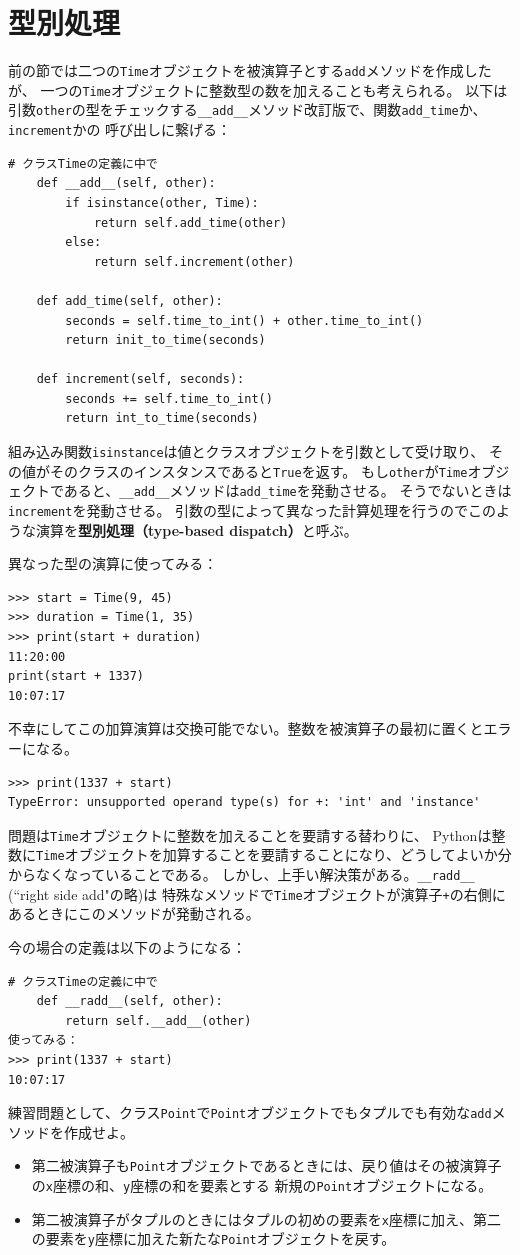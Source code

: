 \documentclass[a4j,12pt,makeidx]{jbook}
\begin{document}
\section{型別処理}
前の節では二つの{\tt Time}オブジェクトを被演算子とする{\tt add}メソッドを作成したが、
一つの{\tt Time}オブジェクトに整数型の数を加えることも考えられる。
以下は引数{\tt other}の型をチェックする{\verb"__add__"}メソッド改訂版で、関数{\tt add\_time}か、{\tt increment}かの
呼び出しに繋げる：
\begin{verbatim}
# クラスTimeの定義に中で
    def __add__(self, other):
        if isinstance(other, Time):
            return self.add_time(other)
        else:
            return self.increment(other)

    def add_time(self, other):
        seconds = self.time_to_int() + other.time_to_int()
        return init_to_time(seconds)

    def increment(self, seconds):
        seconds += self.time_to_int()
        return int_to_time(seconds)
\end{verbatim}
組み込み関数{\tt isinstance}は値とクラスオブジェクトを引数として受け取り、
その値がそのクラスのインスタンスであると{\tt True}を返す。
もし{\tt other}が{\tt Time}オブジェクトであると、{\verb"__add__"}メソッドは{\tt add\_time}を発動させる。
そうでないときは{\tt increment}を発動させる。
引数の型によって異なった計算処理を行うのでこのような演算を{\bf 型別処理（type-based dispatch）}と呼ぶ。\par
異なった型の演算に使ってみる：
\begin{verbatim}
>>> start = Time(9, 45)
>>> duration = Time(1, 35)
>>> print(start + duration)
11:20:00
print(start + 1337)
10:07:17
\end{verbatim}
不幸にしてこの加算演算は交換可能でない。整数を被演算子の最初に置くとエラーになる。
\begin{verbatim}
>>> print(1337 + start)
TypeError: unsupported operand type(s) for +: 'int' and 'instance'
\end{verbatim} \par
問題は{\tt Time}オブジェクトに整数を加えることを要請する替わりに、
Pythonは整数に{\tt Time}オブジェクトを加算することを要請することになり、どうしてよいか分からなくなっていることである。
しかし、上手い解決策がある。{\verb"__radd__"} (``right side add"の略)は
特殊なメソッドで{\tt Time}オブジェクトが演算子{\tt +}の右側にあるときにこのメソッドが発動される。 \par
今の場合の定義は以下のようになる：
\begin{verbatim}
# クラスTimeの定義に中で
    def __radd__(self, other):
        return self.__add__(other)
使ってみる：
>>> print(1337 + start)
10:07:17
\end{verbatim} 
練習問題として、クラス{\tt Point}で{\tt Point}オブジェクトでもタプルでも有効な{\tt add}メソッドを作成せよ。
\begin{itemize}
\item 第二被演算子も{\tt Point}オブジェクトであるときには、戻り値はその被演算子の{\tt x}座標の和、{\tt y}座標の和を要素とする
新規の{\tt Point}オブジェクトになる。
\item 第二被演算子がタプルのときにはタプルの初めの要素を{\tt x}座標に加え、第二の要素を{\tt y}座標に加えた新たな{\tt Point}オブジェクトを戻す。
\end{itemize}
%
\end{document}
